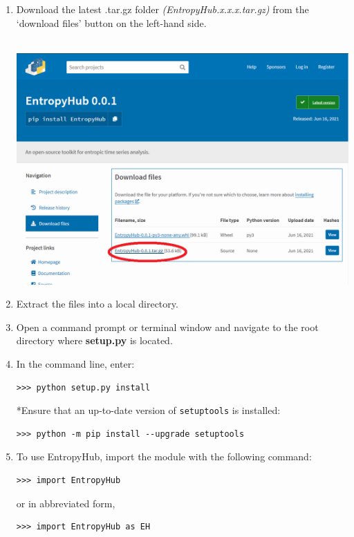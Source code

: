 \documentclass[12pt, a4paper, titlepage, openany]{book}
\begin{document}
\begin{enumerate}
\item Download the latest .tar.gz folder \textit{(EntropyHub.x.x.x.tar.gz)} from the ‘download files’ button on the left-hand side.\\ \ \\
\begin{minipage}[h]{\linewidth}
          \centering
          \includegraphics[scale=.5]{pyscreen2.png}
          \medskip
\end{minipage}
\item Extract the files into a local directory.
\item Open a command prompt or terminal window and navigate to the root directory where \textbf{setup.py} is located.

\item In the command line, enter:
\begin{verbatim}
>>> python setup.py install
\end{verbatim}
*Ensure that an up-to-date version of \texttt{setuptools} is installed:
\begin{verbatim}
>>> python -m pip install --upgrade setuptools
\end{verbatim}
\item To use EntropyHub, import the module with the following command:
\begin{verbatim}
>>> import EntropyHub
\end{verbatim}
or in abbreviated form,
\begin{verbatim}
>>> import EntropyHub as EH
\end{verbatim}
\end{enumerate}
\end{document}
